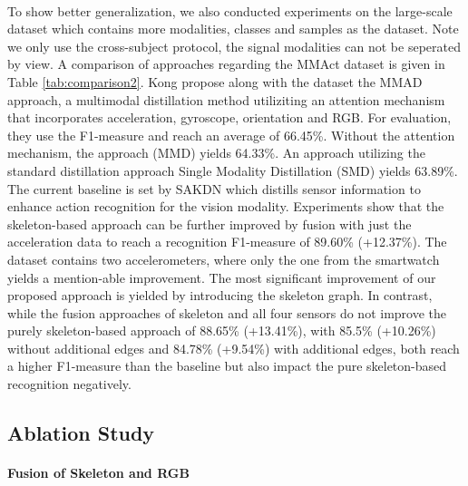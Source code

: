 \paragraph{\mmact{}}


To show better generalization, we also conducted experiments on the large-scale \mmact{} dataset which contains more modalities, classes and samples as the \utdmhad{} dataset. Note we only use the cross-subject protocol, the signal modalities can not be seperated by view.
A comparison of approaches regarding the MMAct dataset is given in Table \ref{tab:comparison2}. Kong \andothers{} propose along with the \mmact{} dataset the MMAD approach, a multimodal distillation method utiliziting an attention mechanism that incorporates acceleration, gyroscope, orientation and RGB. For evaluation, they use the F1-measure and reach an average of 66.45\%. Without the attention mechanism, the approach (MMD) yields 64.33\%. An approach utilizing the standard distillation approach Single Modality Distillation (SMD) yields 63.89\%. The current baseline is set by SAKDN \cite{DBLP:journals/tip/LiuWLL21} which distills sensor information to enhance action recognition for the vision modality. Experiments show that the skeleton-based approach can be further improved by fusion with just the acceleration data to reach a recognition F1-measure of 89.60\% (+12.37\%). The \mmact{} dataset contains two accelerometers, where only the one from the smartwatch yields a mention-able improvement.
The most significant improvement of our proposed approach is yielded by introducing the skeleton graph. 
In contrast, while the fusion approaches of skeleton and all four sensors do not improve the purely skeleton-based approach of 88.65\% (+13.41\%), with 85.5\% (+10.26\%) without additional edges and 84.78\% (+9.54\%) with additional edges, both reach a higher F1-measure than the baseline but also impact the pure skeleton-based recognition negatively.  


\subsection{Ablation Study}

\paragraph{Fusion of Skeleton and RGB}

